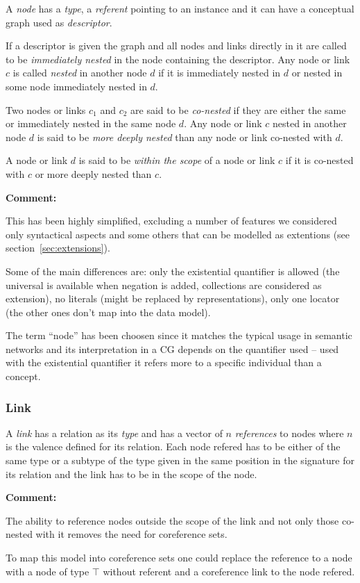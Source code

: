 \documentclass{article}
\newcommand{\defname}{\textit}
\newcommand{\comment}{\textbf{Comment: }}
\begin{document}
A \defname{node} has a \defname{type}, a \defname{referent}
pointing to an instance and it can have a conceptual graph used as
\defname{descriptor}.

If a descriptor is given the graph and all nodes and links directly in
it are called to be \defname{immediately nested} in the node
containing the descriptor. Any node or link $c$ is called
\defname{nested} in another node $d$ if it is immediately nested in
$d$ or nested in some node immediately nested in $d$.

Two nodes or links $c_1$ and $c_2$ are said to be \defname{co-nested}
if they are either the same or immediately nested in the same node
$d$. Any node or link $c$ nested in another node $d$ is said to be
\defname{more deeply nested} than any node or link co-nested with $d$.

A node or link $d$ is said to be \defname{within the scope} of a node
or link $c$ if it is co-nested with $c$ or more deeply nested
than $c$.

\comment{This has been highly simplified, excluding a number of features
we considered only syntactical aspects and some others that can be modelled
as extentions (see section~\ref{sec:extensions}).

Some of the main differences are: only the existential quantifier is
allowed (the universal is available when negation is added,
collections are considered as extension), no literals (might be
replaced by representations), only one locator (the other ones don't
map into the data model).

The term ``node'' has been choosen since it matches the typical usage in
semantic networks and its interpretation in a CG depends on the quantifier
used -- used with the existential quantifier it refers more to a specific
individual than a concept.}

\subsubsection{Link}
\label{sec:links}

A \defname{link} has a relation as its \defname{type} and has a
vector of $n$ \defname{references} to nodes where $n$ is
the valence defined for its relation. Each node refered has to be
either of the same type or a subtype of the type given in the same
position in the signature for its relation and the link has to be in
the scope of the node.

\comment{The ability to reference nodes outside the scope of the link
and not only those co-nested with it removes the need for coreference
sets.

To map this model into coreference sets one could replace the
reference to a node with a node of type $\top$ without referent and a
coreference link to the node refered.}
\end{document}
